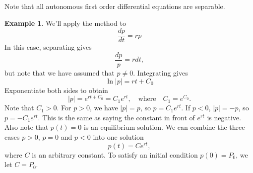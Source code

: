 \documentclass[reqno]{immbook}
\numberwithin{equation}{chapter}
\numberwithin{question}{section}
\numberwithin{theorem}{chapter}
\numberwithin{figure}{chapter}
\theoremstyle{definition}
\newtheorem{example}{Example}[section]
\begin{document}
Note that all autonomous first order differential equations are separable.

\begin{example}
We'll apply the method to
\begin{equation}
   \frac{dp}{dt} = r p
\end{equation}
In this case, separating gives
\begin{equation}
   \frac{dp}{p} = r dt,
\end{equation}
but note that we have assumed that $p\ne 0$.
Integrating gives
\begin{equation}
   \ln | p | = rt+C_0
\end{equation}
Exponentiate both sides to obtain
\begin{equation}
  |p| = e^{rt+C_0} = C_1e^{rt}, \quad \textrm{where} \quad C_1 = e^{C_0}.
\end{equation}
Note that $C_1 > 0$.
For $p > 0$, we have $|p|=p$, so $p=C_1e^{rt}$.
If $p < 0$, $|p| = -p$, so $p = -C_1e^{rt}$.
This is the same as saying the constant in front of $e^{rt}$ is negative.
Also note that $p(t)=0$ is an equilibrium solution.
We can combine the three cases $p>0$, $p=0$ and $p<0$ into one
solution
\begin{equation}
   p(t) = Ce^{rt},
\end{equation}
where $C$ is an arbitrary constant.
To satisfy an initial condition $p(0)=P_0$, we let $C=P_0$.
\end{example}
\end{document}
